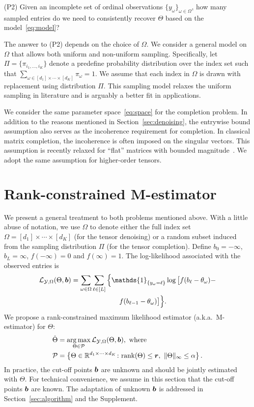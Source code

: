 \documentclass[11pt]{article}
\theoremstyle{plain}
\theoremstyle{definition}
\begin{document}
(P2) Given an incomplete set of ordinal observations $\{y_{\omega}\}_{\omega\in\Omega}$, how many sampled entries do we need to consistently recover $\Theta$ based on the model~\eqref{eq:model}?

The answer to (P2) depends on the choice of $\Omega$. We consider a general model on $\Omega$ that allows both uniform and non-uniform sampling. Specifically, let $\Pi=\{\pi_{i_1,\ldots,i_K}\}$ denote a predefine probability distribution over the index set such that $\sum_{\omega\in[d_1]\times \cdots \times [d_K]} \pi_\omega =1$. We assume that each index in $\Omega$ is drawn with replacement using distribution $\Pi$. This sampling model relaxes the uniform sampling in literature and is arguably a better fit in applications.

We consider the same parameter space~\eqref{eq:space} for the completion problem. In addition to the reasons mentioned in Section~\ref{sec:denoising}, the entrywise bound assumption also serves as the incoherence requirement for completion. In classical matrix completion, the incoherence is often imposed on the singular vectors. This assumption is recently relaxed for ``flat'' matrices with bounded magnitude~\cite{negahban2011estimation,cai2013max,bhaskar20151}. We adopt the same assumption for higher-order tensors.

\section{Rank-constrained M-estimator}\label{sec:theory}
We present a general treatment to both problems mentioned above. With a little abuse of notation, we use $\Omega$ to denote either the full index set $\Omega=[d_1]\times \cdots \times [d_K]$ (for the tensor denoising) or a random subset induced from the sampling distribution $\Pi$ (for the tensor completion). Define $b_0=-\infty$, $b_L=\infty$, $f(-\infty)=0$ and $f(\infty)=1$. The log-likelihood associated with the observed entries is
\begin{align}\label{eq:objective}
\logl(\Theta, \mb)&=\sum_{\omega\in\Omega}\sum_{\ell\in[L]} \Big\{\mathds{1}_{\{y_\omega=\ell\}} \log \big[f(b_\ell-\theta_\omega)- \notag \\
&\quad \quad \quad \quad \quad \quad \quad  f(b_{\ell-1}-\theta_\omega)\big]\Big\}.
\end{align}
We propose a rank-constrained maximum likelihood estimator (a.k.a.\ M-estimator) for $\Theta$:
\begin{align}\label{eq:estimator}
\hat \Theta&=\argmax_{\Theta\in \tP}\logl(\Theta, \mb),\ \text{where}\notag \\
\tP&=\left\{\Theta\in\mathbb{R}^{d_1\times \cdots \times d_K} \colon \text{rank}(\Theta)\leq \mr,\ \mnormSize{}{\Theta}\leq \alpha\right\}.
 \end{align}
In practice, the cut-off points $\bm{b}$ are unknown and should be jointly estimated with $\Theta$. For technical convenience, we assume in this section that the cut-off points $\bm{b}$ are known. The adaptation of unknown $\bm{b}$ is addressed in Section~\ref{sec:algorithm} and the Supplement.
\end{document}
